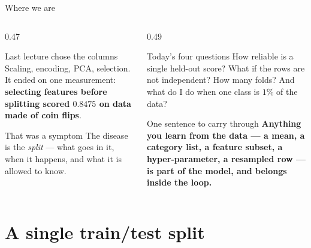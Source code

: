 \documentclass[aspectratio=169]{beamer}
\begin{document}
\begin{frame}[shrink=5]{Where we are}
  \begin{columns}[T]
    \begin{column}{0.47\textwidth}
      \begin{block}{Last lecture chose the columns}
        Scaling, encoding, PCA, selection. It ended on one measurement:
        \textbf{selecting features before splitting scored $0.8475$ on data
        made of coin flips}.
      \end{block}
      \begin{block}{That was a symptom}
        The disease is the \emph{split} --- what goes in it, when it happens,
        and what it is allowed to know.
      \end{block}
    \end{column}
    \begin{column}{0.49\textwidth}
      \begin{exampleblock}{Today's four questions}
        How reliable is a single held-out score? What if the rows are not
        independent? How many folds? And what do I do when one class is
        $1\%$ of the data?
      \end{exampleblock}
      \begin{alertblock}{One sentence to carry through}
        \small \textbf{Anything you learn from the data --- a mean, a
        category list, a feature subset, a hyper-parameter, a resampled
        row --- is part of the model, and belongs inside the loop.}
      \end{alertblock}
    \end{column}
  \end{columns}
\end{frame}

\section[One split]{A single train/test split}
\label{sec:split}
\end{document}
